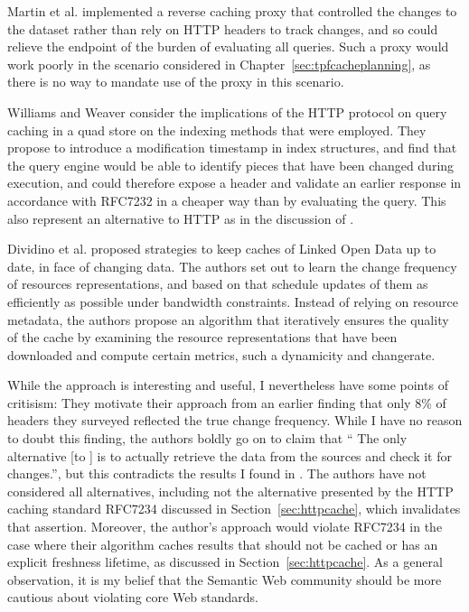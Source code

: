 Martin et al. \cite{sparqlproxy} implemented a reverse caching proxy
that controlled the changes to the dataset rather than rely on HTTP
headers to track changes, and so could relieve the endpoint of the
burden of evaluating all queries. Such a proxy would work poorly in
the scenario considered in Chapter~\ref{sec:tpfcacheplanning}, as
there is no way to mandate use of the proxy in this scenario.

Williams and Weaver \cite{kaseicache} consider the implications of the
HTTP protocol on query caching in a quad store on the indexing methods
that were employed. They propose to introduce a modification timestamp
in index structures, and find that the query engine would be able to
identify pieces that have been changed during execution, and could
therefore expose a  header and validate an
earlier response in accordance with RFC7232 \cite{rfc7232} in a cheaper way
than by evaluating the query. This also represent an alternative to HTTP
 as in the discussion of \cite{papailiou2015graph}.

Dividino et al. \cite{Dividino2015} proposed strategies to keep caches
of Linked Open Data up to date, in face of changing data. The authors
set out to learn the change frequency of resources representations,
and based on that schedule updates of them as efficiently as possible
under bandwidth constraints. Instead of relying on resource metadata,
the authors propose an algorithm that iteratively ensures the quality
of the cache by examining the resource representations that have been
downloaded and compute certain metrics, such a dynamicity and
changerate.


While the approach is interesting and useful, I nevertheless have some
points of critisism: They motivate their approach from an earlier
finding that only 8\% of  headers they surveyed
reflected the true change frequency. While I have no reason to doubt
this finding, the authors boldly go on to claim that `` The only
alternative [to ] is to actually retrieve the
data from the sources and check it for changes.'', but this
contradicts the results I found in \cite{kjernsmo_survey_2015}. The
authors have not considered all alternatives, including not the
alternative presented by the HTTP caching standard RFC7234 discussed
in Section~\ref{sec:httpcache}, which invalidates that
assertion. Moreover, the author's approach would violate RFC7234 in
the case where their algorithm caches results that should not be
cached or has an explicit freshness lifetime, as discussed in
Section~\ref{sec:httpcache}. As a general observation, it is my belief
that the Semantic Web community should be more cautious about
violating core Web standards.



